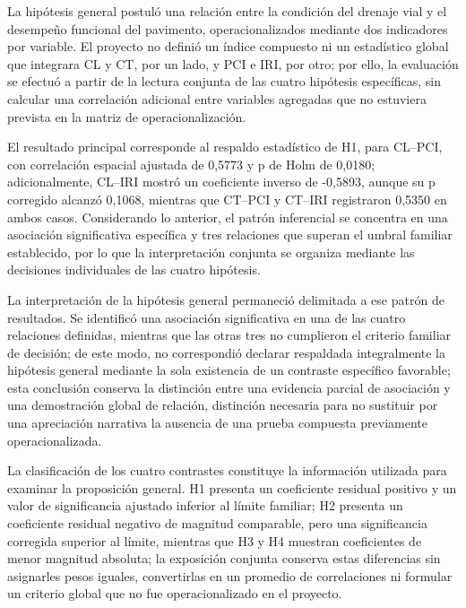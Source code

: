 La hipótesis general postuló una relación entre la condición del drenaje vial y el desempeño funcional del pavimento, operacionalizados mediante dos indicadores por variable. El proyecto no definió un índice compuesto ni un estadístico global que integrara CL y CT, por un lado, y PCI e IRI, por otro; por ello, la evaluación se efectuó a partir de la lectura conjunta de las cuatro hipótesis específicas, sin calcular una correlación adicional entre variables agregadas que no estuviera prevista en la matriz de operacionalización.

El resultado principal corresponde al respaldo estadístico de H1, para CL–PCI, con correlación espacial ajustada de 0,5773 y p de Holm de 0,0180; adicionalmente, CL–IRI mostró un coeficiente inverso de -0,5893, aunque su p corregido alcanzó 0,1068, mientras que CT–PCI y CT–IRI registraron 0,5350 en ambos casos. Considerando lo anterior, el patrón inferencial se concentra en una asociación significativa específica y tres relaciones que superan el umbral familiar establecido, por lo que la interpretación conjunta se organiza mediante las decisiones individuales de las cuatro hipótesis.

La interpretación de la hipótesis general permaneció delimitada a ese patrón de resultados. Se identificó una asociación significativa en una de las cuatro relaciones definidas, mientras que las otras tres no cumplieron el criterio familiar de decisión; de este modo, no correspondió declarar respaldada integralmente la hipótesis general mediante la sola existencia de un contraste específico favorable; esta conclusión conserva la distinción entre una evidencia parcial de asociación y una demostración global de relación, distinción necesaria para no sustituir por una apreciación narrativa la ausencia de una prueba compuesta previamente operacionalizada.


La clasificación de los cuatro contrastes constituye la información utilizada para examinar la proposición general. H1 presenta un coeficiente residual positivo y un valor de significancia ajustado inferior al límite familiar; H2 presenta un coeficiente residual negativo de magnitud comparable, pero una significancia corregida superior al límite, mientras que H3 y H4 muestran coeficientes de menor magnitud absoluta; la exposición conjunta conserva estas diferencias sin asignarles pesos iguales, convertirlas en un promedio de correlaciones ni formular un criterio global que no fue operacionalizado en el proyecto.

